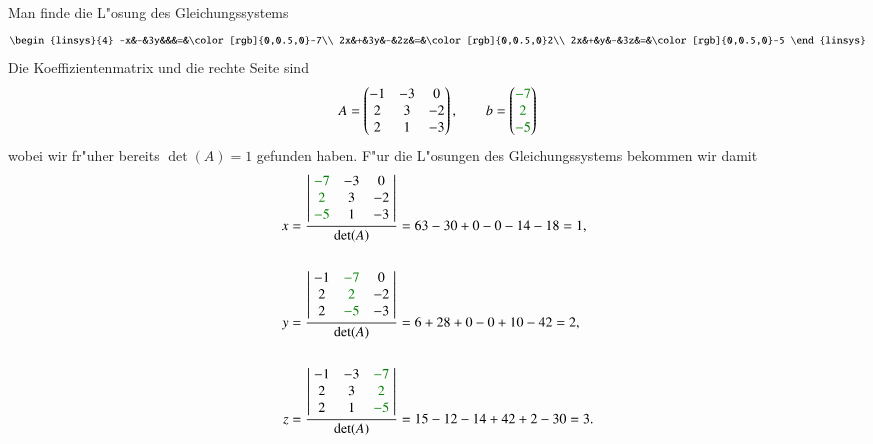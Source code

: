 \begin{beispiel}Man finde die L"osung des Gleichungssystems
\[
\begin{linsys}{4}
-x&-&3y&&&=&\color[rgb]{0,0.5,0}-7\\
2x&+&3y&-&2z&=&\color[rgb]{0,0.5,0}2\\
2x&+&y&-&3z&=&\color[rgb]{0,0.5,0}-5
\end{linsys}
\]
Die Koeffizientenmatrix und die rechte Seite sind
\[
A=\begin{pmatrix}
-1&-3&0\\
2&3&-2\\
2&1&-3
\end{pmatrix}
,\qquad
b=\begin{pmatrix}
\color[rgb]{0,0.5,0}-7\\\color[rgb]{0,0.5,0}2\\\color[rgb]{0,0.5,0}-5
\end{pmatrix}
\]
wobei wir fr"uher bereits $\det(A)=1$ gefunden haben.
F"ur die L"osungen des Gleichungssystems bekommen wir damit
\begin{align*}
x&=\frac{
\left|\;
\begin{matrix}
\color[rgb]{0,0.5,0}-7&-3&0\\
\color[rgb]{0,0.5,0}2&3&-2\\
\color[rgb]{0,0.5,0}-5&1&-3
\end{matrix}
\;\right|
}{\det(A)}
=63-30+0-0-14-18=1,
\\
\\
y&=\frac{
\left|\;
\begin{matrix}
-1&\color[rgb]{0,0.5,0}-7&0\\
2&\color[rgb]{0,0.5,0}2&-2\\
2&\color[rgb]{0,0.5,0}-5&-3
\end{matrix}
\;\right|
}{\det(A)}
=6+28+0-0+10-42=2,
\\
\\
z&=\frac{
\left|\;
\begin{matrix}
-1&-3&\color[rgb]{0,0.5,0}-7\\
2&3&\color[rgb]{0,0.5,0}2\\
2&1&\color[rgb]{0,0.5,0}-5
\end{matrix}
\;\right|
}{\det(A)}
=15-12-14+42+2-30=3.
\end{align*}
\end{beispiel}

